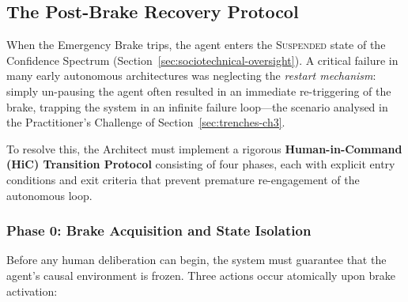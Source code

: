 \subsection{The Post-Brake Recovery Protocol}
\label{sec:post-brake-recovery}

When the Emergency Brake trips, the agent enters the \textsc{Suspended}
state of the Confidence Spectrum (Section~\ref{sec:sociotechnical-oversight}).
A critical failure in many early autonomous architectures was neglecting the
\emph{restart mechanism}: simply un-pausing the agent often resulted in an
immediate re-triggering of the brake, trapping the system in an infinite
failure loop—the scenario analysed in the Practitioner's Challenge of
Section~\ref{sec:trenches-ch3}.

To resolve this, the Architect must implement a rigorous
\textbf{Human-in-Command (HiC) Transition Protocol} consisting of four
phases, each with explicit entry conditions and exit criteria that prevent
premature re-engagement of the autonomous loop.

\subsubsection*{Phase 0: Brake Acquisition and State Isolation}

Before any human deliberation can begin, the system must guarantee that the
agent's causal environment is frozen.  Three actions occur atomically upon
brake activation:

